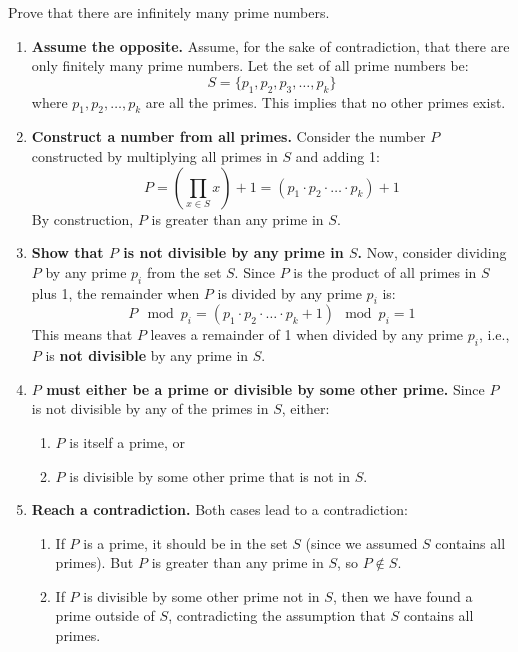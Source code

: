     \begin{example}
        Prove that there are infinitely many prime numbers.

        \begin{enumerate}
            \item \textbf{Assume the opposite.} 
            Assume, for the sake of contradiction, that there are only finitely many prime numbers. Let the set of all prime numbers be:
            \[
            S = \{p_1, p_2, p_3, \dots, p_k\}
            \]
            where \( p_1, p_2, \dots, p_k \) are all the primes. This implies that no other primes exist.
        
            \item \textbf{Construct a number from all primes.} 
            Consider the number \( P \) constructed by multiplying all primes in \( S \) and adding 1:
            \[
            P = \left( \prod_{x \in S} x \right) + 1 = (p_1 \cdot p_2 \cdot \dots \cdot p_k) + 1
            \]
            By construction, \( P \) is greater than any prime in \( S \).
        
            \item \textbf{Show that \( P \) is not divisible by any prime in \( S \).} 
            Now, consider dividing \( P \) by any prime \( p_i \) from the set \( S \). Since \( P \) is the product of all primes in \( S \) plus 1, the remainder when \( P \) is divided by any prime \( p_i \) is:
            \[
            P \mod p_i = (p_1 \cdot p_2 \cdot \dots \cdot p_k + 1) \mod p_i = 1
            \]
            This means that \( P \) leaves a remainder of 1 when divided by any prime \( p_i \), i.e., \( P \) is \textbf{not divisible} by any prime in \( S \).
        
            \item \textbf{\( P \) must either be a prime or divisible by some other prime.} 
            Since \( P \) is not divisible by any of the primes in \( S \), either:
            \begin{enumerate}
                \item \( P \) is itself a prime, or
                \item \( P \) is divisible by some other prime that is not in \( S \).
            \end{enumerate}
        
            \item \textbf{Reach a contradiction.}
            Both cases lead to a contradiction:
            \begin{enumerate}
                \item If \( P \) is a prime, it should be in the set \( S \) (since we assumed \( S \) contains all primes). But \( P \) is greater than any prime in \( S \), so \( P \notin S \).
                \item If \( P \) is divisible by some other prime not in \( S \), then we have found a prime outside of \( S \), contradicting the assumption that \( S \) contains all primes.
            \end{enumerate}
            

\end{enumerate}
\end{example}
